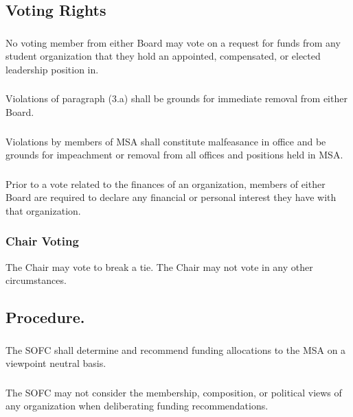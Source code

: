 \subsection{Voting Rights}
\subsubsection{}
No voting member from either Board may vote on a request for funds from any student organization that they hold an appointed, compensated, or elected leadership position in.
\subsubsection{}
Violations of paragraph (3.a) shall be grounds for immediate removal from either Board.
\subsubsection{}
Violations by members of MSA shall constitute malfeasance in office and be grounds for impeachment or removal from all offices and positions held in MSA.
\subsubsection{}
Prior to a vote related to the finances of an organization, members of either Board are required to declare any financial or personal interest they have with that organization.
\subsubsection{Chair Voting}
\subsubsubsection{}
The Chair may vote to break a tie.
\subsubsubsection{}
The Chair may not vote in any other circumstances.

\subsection{Procedure.}
\subsubsection{}
The SOFC shall determine and recommend funding allocations to the MSA on a viewpoint neutral basis.
\subsubsection{}
The SOFC may not consider the membership, composition, or political views of any organization when deliberating funding recommendations.
